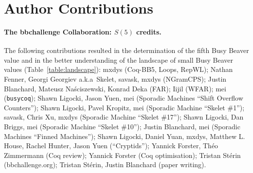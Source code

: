 \documentclass[a4paper,british]{article}
\theoremstyle{definition} %
\numberwithin{equation}{section}
\theoremstyle{definition} %
\newcommand{\CoqBB}{Coq-BB5\xspace}
\begin{document}
\appendix
{}
\newpage
\section{Author Contributions}\label{app:contribs}

\paragraph{The bbchallenge Collaboration: $S(5)$ credits.} The following contributions resulted in the determination of the fifth Busy Beaver value and in the better understanding of the landscape of small Busy Beaver values (Table~\ref{table:landscape}): mxdys (\CoqBB, Loops, RepWL); Nathan Fenner, Georgi Georgiev a.k.a~Skelet, savask, mxdys (NGramCPS); Justin Blanchard, Mateusz Naściszewski, Konrad Deka (FAR); Iijil (WFAR); mei (\texttt{busycoq}); Shawn Ligocki, Jason Yuen, mei (Sporadic Machines ``Shift Overflow Counters''); Shawn Ligocki, Pavel Kropitz, mei (Sporadic Machine ``Skelet \#1''); savask, Chris Xu, mxdys (Sporadic Machine ``Skelet \#17''); Shawn Ligocki, Dan Briggs, mei (Sporadic Machine ``Skelet \#10''); Justin Blanchard, mei (Sporadic Machines ``Finned Machines''); Shawn Ligocki, Daniel Yuan, mxdys, Matthew L. House, Rachel Hunter, Jason Yuen (``Cryptids''); Yannick Forster, Théo Zimmermann (Coq review); Yannick Forster (Coq optimisation); Tristan Stérin (bbchallenge.org); Tristan Stérin, Justin Blanchard (paper writing).
\end{document}
